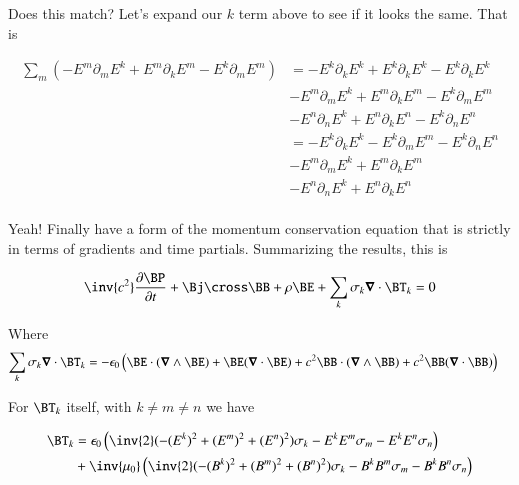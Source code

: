\documentclass{article}
\begin{document}
Does this match?  Let's expand our $k$ term above to see if it looks the same.  That is

\begin{align*}
\sum_m (-E^m \partial_m E^k +E^m \partial_k E^m -E^k \partial_m E^m) 
&=
-E^k \partial_k E^k 
+E^k \partial_k E^k 
-E^k \partial_k E^k \\
&-E^m \partial_m E^k 
+E^m \partial_k E^m 
-E^k \partial_m E^m \\
&-E^n \partial_n E^k 
+E^n \partial_k E^n 
-E^k \partial_n E^n \\
&=
-E^k \partial_k E^k 
-E^k \partial_m E^m
-E^k \partial_n E^n \\
&-E^m \partial_m E^k 
+E^m \partial_k E^m \\
&-E^n \partial_n E^k 
+E^n \partial_k E^n \\
\end{align*}

Yeah!  Finally have a form of the momentum conservation equation that is strictly in terms of gradients and time partials.  Summarizing the results, this is

\begin{align}
\inv{c^2}\PD{t}{\BP} + \Bj \cross \BB + \rho \BE + \sum_k \sigma_k \spacegrad \cdot \BT_k = 0
\end{align}

Where
\begin{align*}
\sum_k \sigma_k \spacegrad \cdot \BT_k
&=
-\epsilon_0 \left(
\BE \cdot (\spacegrad \wedge \BE) + \BE (\spacegrad \cdot \BE) 
+ c^2 \BB \cdot (\spacegrad \wedge \BB) 
+ c^2 \BB (\spacegrad \cdot \BB) \right)
\end{align*}

For $\BT_k$ itself, with $k \ne m \ne n$ we have

\begin{align*}
\BT_k &= 
\epsilon_0 \left( \inv{2}(-(E^k)^2 + (E^m)^2 + (E^n)^2)\sigma_k - E^k E^m \sigma_m - E^k E^n \sigma_n \right) \\
&+ \inv{\mu_0}\left(\inv{2}(-(B^k)^2 + (B^m)^2 + (B^n)^2)\sigma_k - B^k B^m \sigma_m - B^k B^n \sigma_n \right)
\end{align*}



\end{document}
